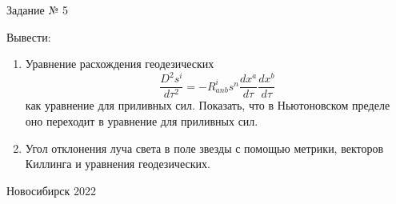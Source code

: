 \documentclass[12pt,pagesize,paper=192mm:108mm,landscape]{scrbook}
\begin{document}
\begin{titlepage}
  \vspace*{-0.5em}
  \begin{center}    




    \vfill
    \Large
    Задание № 5
    \bigskip

    \normalsize
    \begin{minipage}{0.7\linewidth}

Вывести: 
\begin{enumerate}
\item  Уравнение расхождения геодезических
  \[\frac{D^2s^i}{d\tau^2} = -R^i_{anb} s^n \frac{dx^a}{d\tau}\frac{dx^b}{d\tau}\]
  как уравнение для приливных сил. Показать, что в
  Ньютоновском пределе оно переходит в уравнение для приливных сил.
\item Угол отклонения луча света в поле звезды с помощью метрики,
  векторов Киллинга и уравнения геодезических.
\end{enumerate}
    \end{minipage}
    \vfill

    \normalsize \ccbysa\hspace{0.5em}  Новосибирск 2022
  \end{center}
\end{titlepage}
\end{document}
